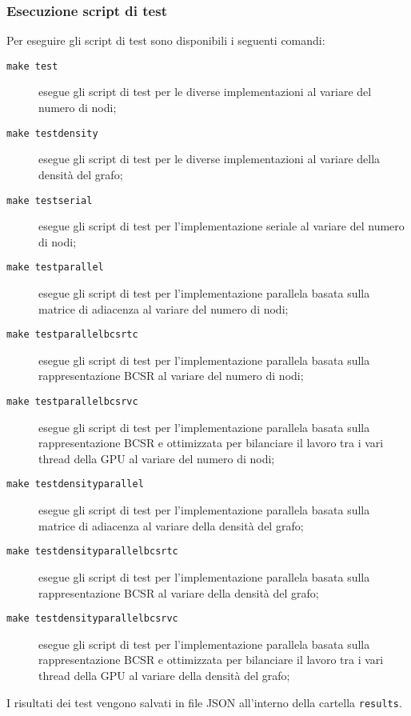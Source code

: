     \subsubsection*{Esecuzione script di test}

        Per eseguire gli script di test sono disponibili i seguenti comandi:
        \begin{description}
            \item[\texttt{make test}] esegue gli script di test per le diverse implementazioni al variare del numero di nodi;
            \item[\texttt{make testdensity}] esegue gli script di test per le diverse implementazioni al variare della densità del grafo;
            \item[\texttt{make testserial}] esegue gli script di test per l'implementazione seriale al variare del numero di nodi;
            \item[\texttt{make testparallel}] esegue gli script di test per l'implementazione parallela basata sulla matrice di adiacenza al variare del numero di nodi;
            \item[\texttt{make testparallelbcsrtc}] esegue gli script di test per l'implementazione parallela basata sulla rappresentazione BCSR al variare del numero di nodi;
            \item[\texttt{make testparallelbcsrvc}] esegue gli script di test per l'implementazione parallela basata sulla rappresentazione BCSR e ottimizzata per bilanciare il lavoro tra i vari thread della GPU al variare del numero di nodi;
            \item[\texttt{make testdensityparallel}] esegue gli script di test per l'implementazione parallela basata sulla matrice di adiacenza al variare della densità del grafo;
            \item[\texttt{make testdensityparallelbcsrtc}] esegue gli script di test per l'implementazione parallela basata sulla rappresentazione BCSR al variare della densità del grafo;
            \item[\texttt{make testdensityparallelbcsrvc}] esegue gli script di test per l'implementazione parallela basata sulla rappresentazione BCSR e ottimizzata per bilanciare il lavoro tra i vari thread della GPU al variare della densità del grafo;
        \end{description}

        I risultati dei test vengono salvati in file JSON all'interno della cartella \texttt{results}.


